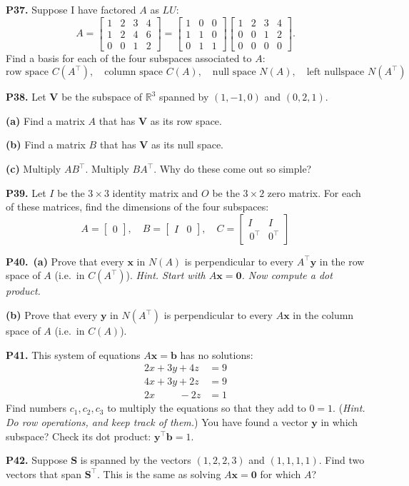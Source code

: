 \documentclass[12pt]{amsart}
\newcommand{\bb}{\bm{b}}
\newcommand{\bx}{\bm{x}}
\newcommand{\by}{\bm{y}}
\newcommand{\bS}{\bm{S}}
\newcommand{\bV}{\bm{V}}
\newcommand{\bzero}{\bm{0}}
\newcommand{\RR}{\mathbb{R}}
\newcommand{\prob}[1]{\bigskip\noindent\textbf{#1.}\quad }
\newcommand{\epart}[1]{\medskip\noindent\textbf{(#1)}\quad }
\newcommand{\ppart}[1]{\,\textbf{(#1)}\quad }
\begin{document}
\prob{P37}  Suppose I have factored $A$ as $LU$:
    $$A = \begin{bmatrix} 1 & 2 & 3 & 4 \\
                         1 & 2 & 4 & 6 \\
                         0 & 0 & 1 & 2 \end{bmatrix}
        = \begin{bmatrix} 1 & 0 & 0 \\ 1 & 1 & 0 \\ 0 & 1 & 1 \end{bmatrix}
          \begin{bmatrix} 1 & 2 & 3 & 4 \\ 0 & 0 & 1 & 2 \\ 0 & 0 & 0 & 0 \end{bmatrix}.$$
Find a basis for each of the four subspaces associated to $A$:
    $$\text{row space } C(A^\top), \quad \text{column space } C(A), \quad \text{null space } N(A), \quad \text{left nullspace } N(A^\top)$$


\prob{P38}  Let $\bV$ be the subspace of $\RR^3$ spanned by $(1,-1,0)$ and $(0,2,1)$.

\epart{a} Find a matrix $A$ that has $\bV$ as its row space.

\epart{b} Find a matrix $B$ that has $\bV$ as its null space.

\epart{c} Multiply $AB^\top$.  Multiply $BA^\top$.  Why do these come out so simple?


\prob{P39}  Let $I$ be the $3\times 3$ identity matrix and $O$ be the $3\times 2$ zero matrix.  For each of these matrices, find the dimensions of the four subspaces:
    $$A = \begin{bmatrix} 0 \end{bmatrix}, \quad B = \begin{bmatrix} I & 0 \end{bmatrix}, \quad C = \begin{bmatrix} I & I \\ \,0^\top & 0^\top \end{bmatrix}$$


\prob{P40} \ppart{a}  Prove that every $\bx$ in $N(A)$ is perpendicular to every $A^\top \by$ in the row space of $A$ (i.e.~in $C(A^\top)$).  \emph{Hint. Start with $A \bx = \bzero$.  Now compute a dot product.}

\epart{b}  Prove that every $\by$ in $N(A^\top)$ is perpendicular to every $A \bx$ in the column space of $A$ (i.e.~in $C(A)$).


\prob{P41}  This system of equations $A\bx = \bb$ has no solutions:
\begin{align*}
2 x + 3 y + 4 z &= 9 \\
4 x + 3 y + 2 z &= 9 \\
2 x \phantom{+sxx} - 2 z &= 1
\end{align*}
Find numbers $c_1,c_2,c_3$ to multiply the equations so that they add to $0=1$.  (\emph{Hint.  Do row operations, and keep track of them.})  You have found a vector $\by$ in which subspace?  Check its dot product: $\by^\top \bb = 1$.


\prob{P42}  Suppose $\bS$ is spanned by the vectors $(1,2,2,3)$ and $(1,1,1,1)$.  Find two vectors that span $\bS^\top$.  This is the same as solving $A\bx = \bzero$ for which $A$?
\end{document}
